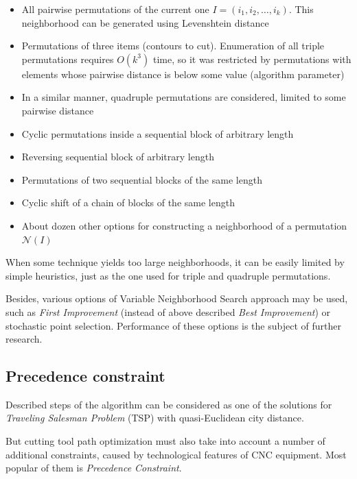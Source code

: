 \documentclass{ifacconf}
\begin{document}
\begin{itemize}
\item All pairwise permutations of the current one
$I=(i_1, i_2, \dots, i_k)$.
This neighborhood can be
generated using Levenshtein distance

\item Permutations of three items (contours to cut).
Enumeration of all triple permutations
requires $O(k^3)$ time,
so it was restricted
by permutations with elements
whose pairwise distance is below
some value
(algorithm parameter)

\item In a similar manner,
quadruple permutations are considered,
limited to some pairwise distance

\item Cyclic permutations inside a sequential block of arbitrary length
\item Reversing sequential block of arbitrary length
\item Permutations of two sequential blocks of the same length
\item Cyclic shift of a chain of blocks of the same length
\item About dozen other options for constructing a neighborhood of a permutation $ \mathcal N (I) $
\end{itemize}

When some technique yields
too large neighborhoods,
it can be easily limited
by simple heuristics,
just as the one used for
triple and quadruple permutations.

Besides,
various options of
Variable Neighborhood Search approach
may be used,
such as
\textit{First Improvement}
(instead of above described \textit{Best Improvement})
or
stochastic point selection.
Performance of these options
is the subject of further research.

\subsection{Precedence constraint}

Described steps of the algorithm
can be considered as one of the solutions
for
\textit{Traveling Salesman Problem}
(TSP)
with quasi-Euclidean city distance.

But cutting tool path optimization
must also take into account a number of
additional constraints,
caused by technological features
of CNC equipment.
Most popular of them is
\textit{Precedence Constraint}.
\end{document}

